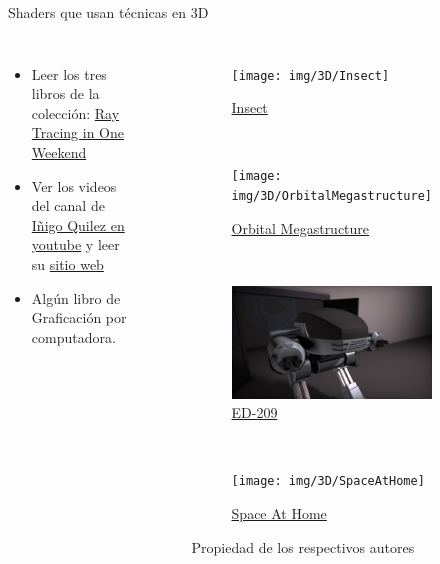 \begin{frame}{Shaders que usan técnicas en 3D}
\begin{columns}
    \begin{itemize}
         \item Leer los tres libros de la colección: \href{https://raytracing.github.io/}{Ray Tracing in One Weekend}
         \item Ver los videos del canal de \href{https://www.youtube.com/c/InigoQuilez}{Iñigo Quilez en youtube} y leer su \href{https://iquilezles.org/}{sitio web}
         \item Algún libro de Graficación por computadora.
     \end{itemize}
\begin{figure}[htp]
 \centering
 \begin{subfigure}[b]{0.42\textwidth}
   \texttt{[image: img/3D/Insect]}
   \caption{\href{https://www.shadertoy.com/view/Mss3zM}{Insect}}
 \end{subfigure}
~
 \begin{subfigure}[b]{0.42\textwidth}
   \texttt{[image: img/3D/OrbitalMegastructure]}
   \caption{\href{https://www.shadertoy.com/view/mtyGWy}{Orbital Megastructure}}
 \end{subfigure}
\\
 \begin{subfigure}[b]{0.42\textwidth}
   \includegraphics[width=\textwidth]{img/3D/ED-209}
   \caption{\href{https://www.shadertoy.com/view/wsGczG}{ED-209}}
 \end{subfigure}
~
 \begin{subfigure}[b]{0.42\textwidth}
   \texttt{[image: img/3D/SpaceAtHome]}
   \caption{\href{https://www.shadertoy.com/view/MXS3zy}{Space At Home}}
 \end{subfigure}
 \caption{Propiedad de los respectivos autores}
\end{figure}
\end{columns}
\end{frame}

